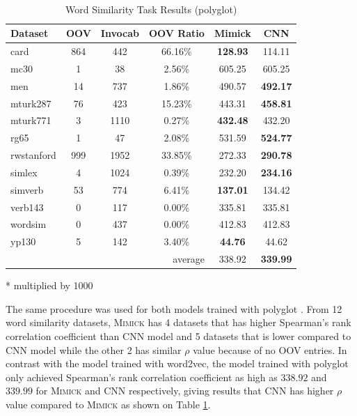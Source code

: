     \begin{table}[!ht]
      \begin{threeparttable} 
      \begin{center}
        \caption{Word Similarity Task Results (polyglot)}
        ~\\
        \label{tab:wordsim:polyglot}
        \begin{tabular}{l|c|c|c|c|c}
          \textbf{Dataset} & \textbf{OOV} & \textbf{Invocab} & \textbf{OOV Ratio} & \textbf{Mimick}\tnote{*} & \textbf{CNN}\tnote{*}\\
          \hline
          card & 864 & 442 & 66.16\% & \textbf{128.93} & 114.11\\
          mc30 & 1 & 38 & 2.56\% & 605.25 & 605.25\\
          men & 14 & 737 & 1.86\% & 490.57 & \textbf{492.17}\\
          mturk287 & 76 & 423 & 15.23\% & 443.31 & \textbf{458.81}\\
          mturk771 & 3 & 1110 & 0.27\% & \textbf{432.48} & 432.20\\
          rg65 & 1 & 47 & 2.08\% & 531.59 & \textbf{524.77}\\
          rwstanford & 999 & 1952 & 33.85\% & 272.33 & \textbf{290.78}\\
          simlex & 4 & 1024 & 0.39\% & 232.20 & \textbf{234.16}\\
          simverb & 53 & 774 & 6.41\% & \textbf{137.01} & 134.42\\
          verb143 & 0 & 117 & 0.00\% & 335.81 & 335.81\\
          wordsim & 0 & 437 & 0.00\% & 412.83 & 412.83\\
          yp130 & 5 & 142 & 3.40\% & \textbf{44.76} & 44.62\\
          \hline
          \multicolumn{4}{r|}{average} & 338.92 & \textbf{339.99}\\
        \end{tabular}
        \begin{tablenotes}
          \item[*] multiplied by 1000
        \end{tablenotes}
      \end{center}
    \end{threeparttable} 
    \end{table}

    The same procedure was used for both models trained with polyglot
    \citep{polyglot2013alrfou}. From 12 word similarity datasets,
    \textsc{Mimick} has 4 datasets that has higher Spearman's rank
    correlation coefficient than CNN model and 5 datasets that is
    lower compared to CNN model while the other 2 has similar $\rho$
    value because of no OOV entries. In contrast with the model
    trained with word2vec, the model trained with polyglot
    \citep{polyglot2013alrfou} only achieved Spearman's rank
    correlation coefficient as high as $338.92$ and $339.99$ for
    \textsc{Mimick} and CNN respectively, giving results that CNN has
    higher $\rho$ value compared to \textsc{Mimick} as shown on Table
    \ref{tab:wordsim:polyglot}.

